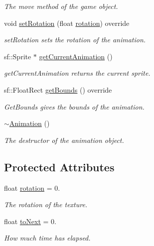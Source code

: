 \begin{DoxyCompactItemize}
\begin{DoxyCompactList}\small\item\em The move method of the game object. \end{DoxyCompactList}\item 
void \hyperlink{class_animation_a539ba77ceb4c5e3677ac16a364afc627}{set\+Rotation} (float \hyperlink{class_animation_a5c68dd5bc1004cf064ff0c2d3aad9abb}{rotation}) override
\begin{DoxyCompactList}\small\item\em set\+Rotation sets the rotation of the animation. \end{DoxyCompactList}\item 
sf\+::\+Sprite $\ast$ \hyperlink{class_animation_afcc78d89a6cc01d6c9b8ba0753e3d83d}{get\+Current\+Animation} ()
\begin{DoxyCompactList}\small\item\em get\+Current\+Animation returns the current sprite. \end{DoxyCompactList}\item 
sf\+::\+Float\+Rect \hyperlink{class_animation_a7fbae20a3e33a7388da42da937016c25}{get\+Bounds} () override
\begin{DoxyCompactList}\small\item\em Get\+Bounds gives the bounds of the animation. \end{DoxyCompactList}\item 
\hyperlink{class_animation_a401b68793d4fbf48d481c030ee4b2a16}{$\sim$\+Animation} ()
\begin{DoxyCompactList}\small\item\em The destructor of the animation object. \end{DoxyCompactList}\end{DoxyCompactItemize}
\subsection*{Protected Attributes}
\begin{DoxyCompactItemize}
\item 
float \hyperlink{class_animation_a5c68dd5bc1004cf064ff0c2d3aad9abb}{rotation} = 0.
\begin{DoxyCompactList}\small\item\em The rotation of the texture. \end{DoxyCompactList}\item 
float \hyperlink{class_animation_afd9ad77afa13d0dc50586e0780ab6b20}{to\+Next} = 0.
\begin{DoxyCompactList}\small\item\em How much time has elapsed. \end{DoxyCompactList}\end{DoxyCompactItemize}
